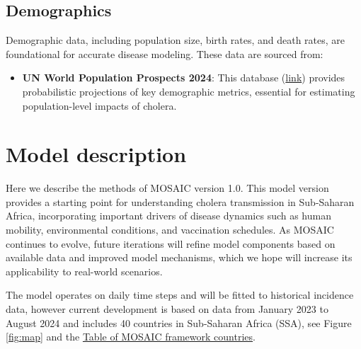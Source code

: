 \documentclass[
]{book}
\providecommand{\tightlist}{%
  \setlength{\itemsep}{0pt}\setlength{\parskip}{0pt}}
\begin{document}
\section{Demographics}\label{demographics}

Demographic data, including population size, birth rates, and death rates, are foundational for accurate disease modeling. These data are sourced from:

\begin{itemize}
\tightlist
\item
  \textbf{UN World Population Prospects 2024}: This database (\href{https://population.un.org/wpp/Download/}{link}) provides probabilistic projections of key demographic metrics, essential for estimating population-level impacts of cholera.
\end{itemize}

\chapter{Model description}\label{model-description}

Here we describe the methods of MOSAIC version 1.0. This model version provides a starting point for understanding cholera transmission in Sub-Saharan Africa, incorporating important drivers of disease dynamics such as human mobility, environmental conditions, and vaccination schedules. As MOSAIC continues to evolve, future iterations will refine model components based on available data and improved model mechanisms, which we hope will increase its applicability to real-world scenarios.

The model operates on daily time steps and will be fitted to historical incidence data, however current development is based on data from January 2023 to August 2024 and includes 40 countries in Sub-Saharan Africa (SSA), see Figure \ref{fig:map} and the \hyperref[mosaic-table]{Table of MOSAIC framework countries}.
\end{document}
